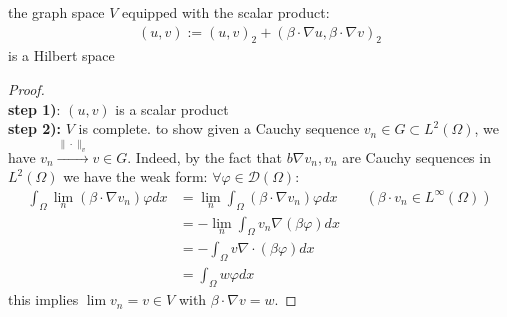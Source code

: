 \begin{lemma}
		the graph space $V$ equipped with the scalar product:
	\begin{align*}
		(u, v):= (u, v)_2 + (\beta \cdot \nabla u, \beta \cdot \nabla v )_2
	\end{align*}
	is a Hilbert space
\end{lemma}
\begin{proof}\quad\\
\textbf{step 1)}: $(u, v)$ is a scalar product
\\
\textbf{step 2):} $V$ is complete. to show given a Cauchy sequence $v_n \in G \subset L^2(\Omega)$, we have $v_n \overset{\|\cdot \|_v}{\rightarrow} v \in G$. Indeed, by the fact that $b \nabla v_n, v_n$ are Cauchy sequences in $L^2(\Omega)$ we have the weak form: $\forall \varphi \in \mathcal{D}(\Omega)$:
\begin{align*}
	\int_\Omega \lim_n(\beta \cdot \nabla v_n) \varphi dx 
	&= \lim_n  \int_\Omega (\beta \cdot \nabla  v_n ) \varphi dx \qquad (\beta \cdot v_n \in L^\infty(\Omega))  \\
	&= -\lim_n  \int_\Omega v_n \nabla(\beta \varphi) dx \\
	&= -\int_\Omega v \nabla \cdot   (\beta \varphi) dx \\
	&= \int_\Omega w \varphi dx 
\end{align*}
this implies $\lim v_n = v \in V$ with $\beta \cdot \nabla v = w$. 
\end{proof}


